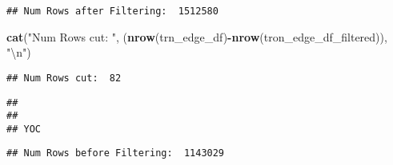 \documentclass[]{article}
\newenvironment{Shaded}{\begin{snugshade}}{\end{snugshade}}
\newcommand{\KeywordTok}[1]{\textcolor[rgb]{0.13,0.29,0.53}{\textbf{#1}}}
\newcommand{\CharTok}[1]{\textcolor[rgb]{0.31,0.60,0.02}{#1}}
\newcommand{\StringTok}[1]{\textcolor[rgb]{0.31,0.60,0.02}{#1}}
\newcommand{\OperatorTok}[1]{\textcolor[rgb]{0.81,0.36,0.00}{\textbf{#1}}}
\newcommand{\NormalTok}[1]{#1}
\begin{document}
\begin{verbatim}
## Num Rows after Filtering:  1512580
\end{verbatim}

\begin{Shaded}
\begin{Highlighting}[]
\KeywordTok{cat}\NormalTok{(}\StringTok{"Num Rows cut: "}\NormalTok{, (}\KeywordTok{nrow}\NormalTok{(trn_edge_df)}\OperatorTok{-}\KeywordTok{nrow}\NormalTok{(tron_edge_df_filtered)), }\StringTok{"}\CharTok{\textbackslash{}n}\StringTok{"}\NormalTok{)}
\end{Highlighting}
\end{Shaded}

\begin{verbatim}
## Num Rows cut:  82
\end{verbatim}

\begin{Shaded}
\end{Shaded}

\begin{verbatim}
## 
## 
## YOC
\end{verbatim}

\begin{Shaded}
\end{Shaded}

\begin{verbatim}
## Num Rows before Filtering:  1143029
\end{verbatim}
\end{document}
